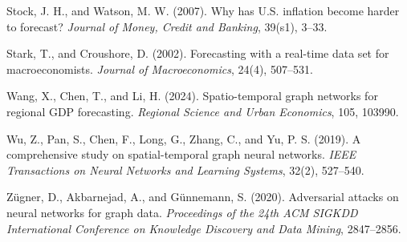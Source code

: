 \documentclass[
]{article}
\begin{document}
Stock, J. H., and Watson, M. W. (2007). Why has U.S. inflation become
harder to forecast? \emph{Journal of Money, Credit and Banking}, 39(s1),
3--33.

Stark, T., and Croushore, D. (2002). Forecasting with a real-time data
set for macroeconomists. \emph{Journal of Macroeconomics}, 24(4),
507--531.

Wang, X., Chen, T., and Li, H. (2024). Spatio-temporal graph networks
for regional GDP forecasting. \emph{Regional Science and Urban
Economics}, 105, 103990.

Wu, Z., Pan, S., Chen, F., Long, G., Zhang, C., and Yu, P. S. (2019). A
comprehensive study on spatial-temporal graph neural networks.
\emph{IEEE Transactions on Neural Networks and Learning Systems}, 32(2),
527--540.

Z\"ugner, D., Akbarnejad, A., and G\"unnemann, S. (2020). Adversarial
attacks on neural networks for graph data. \emph{Proceedings of the 24th
ACM SIGKDD International Conference on Knowledge Discovery and Data
Mining}, 2847--2856.
\end{document}
